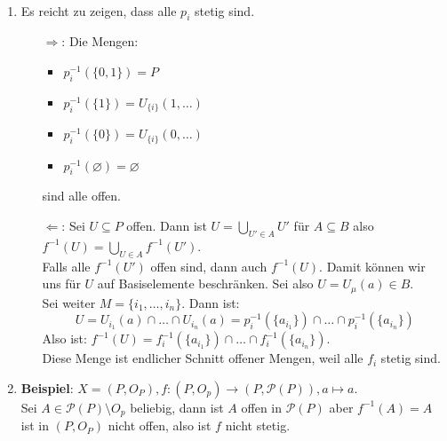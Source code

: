\begin{solution}
  \
  \begin{enumerate}[label=(\alph*)]
    \item Es reicht zu zeigen, dass alle \( p_i \) stetig sind.
    \begin{itemize}
      \item[\( \Rightarrow \):] Die Mengen:
      \begin{itemize}
        \item \( p_i^{-1}(\{ 0,1 \}) = P \)
        \item \( p_i^{-1}(\{ 1 \}) = U_{\{ i \}}(1,\dots) \)
        \item \( p_i^{-1}(\{ 0 \}) = U_{\{ i \}}(0,\dots) \) 
        \item \( p_i^{-1}(\varnothing) = \varnothing \)
      \end{itemize}
      sind alle offen.
      
      \item[\( \Leftarrow \):] Sei \( U \subseteq P \) offen. Dann ist \( U = \bigcup_{U' \in A}U' \) für \( A \subseteq B \) also \( f^{-1}(U) = \bigcup_{U \in A} f^{-1}(U') \). \\
      Falls alle \( f^{-1}(U') \) offen sind, dann auch \( f^{-1}(U) \). Damit können wir uns für \( U \) auf Basiselemente beschränken. Sei also \( U = U_\mu(a) \in B \). \\
      Sei weiter \( M = \{ i_1, \dots,i_n \} \). Dann ist:
      \begin{equation*}
        U = U_{i_1}(a)\cap \dots \cap U_{i_n}(a) = p_i^{-1}(\{ a_{i_1} \}) \cap \dots \cap p_i^{-1}(\{ a_{i_n} \})
      \end{equation*}
      Also ist: \( f^{-1}(U) = f_i^{-1}(\{ a_{i_1} \}) \cap \dots \cap f_i^{-1}(\{ a_{i_n} \}) \). \\
      Diese Menge ist endlicher Schnitt offener Mengen, weil alle \( f_i \) stetig sind.
    \end{itemize}

    \item \textbf{Beispiel}: \( X = (P, O_P), f: (P, O_p) \to (P, \mathcal{P}(P)), a \mapsto a \). \\
    Sei \( A \in \mathcal{P}(P) \setminus O_p \) beliebig, dann ist \( A \) offen in \( \mathcal{P}(P) \) aber 
    \( f^{-1}(A) = A \) ist in \( (P, O_P) \) nicht offen, also ist \( f \) nicht stetig.
  \end{enumerate}
\end{solution}



